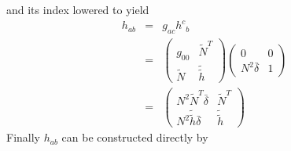 \documentclass[twocolumn]{article}
\begin{document}
and its index lowered to yield
\begin{eqnarray*}
   h_{ab} & = &  g_{a c} {h^{c}}_{b}  \\
             & = & \left(
                      \begin{array}{cc}
                         g_{00}   & {\tilde N}^T \\
                         \tilde N & {\tilde {\tilde h}}
                      \end{array}
                   \right)
                   \left(
                      \begin{array}{cc}
                         0               & 0 \\
                         N^2 \bar \delta & 1
                      \end{array}
                   \right) \\
             & = & \left(
                      \begin{array}{cc}
                         N^2 {\tilde N}^T \bar \delta & {\tilde N}^T \\
                         N^2 {\tilde {\tilde h}} \bar \delta & {\tilde {\tilde h}}
                      \end{array}
                   \right)
\end{eqnarray*}
Finally $h_{ab}$ can be constructed directly by
\end{document}
